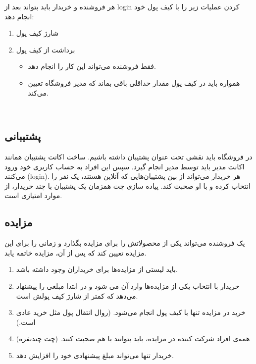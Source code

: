 \documentclass[]{article}
\begin{document}
هر فروشنده و خریدار باید بتواند بعد از login کردن عملیات زیر را با کیف پول خود انجام دهد:

\begin{enumerate}


\item
شارژ کیف پول

\item
برداشت از کیف پول

\begin{itemize}[label=$\blacksquare$]
\item
فقط فروشنده می‌تواند این کار را انجام دهد.

\item
همواره باید در کیف پول مقدار حداقلی باقی بماند که مدیر فروشگاه تعیین می‌کند.

\end{itemize}

\end{enumerate}



 \Large \textbf{\\
}
\subsection*{{\titr پشتیبانی}}

در فروشگاه باید نقشی تحت عنوان پشتیبان داشته باشیم. ساخت اکانت پشتیبان همانند اکانت \textcolor{CustomColor}{مدیر} باید توسط مدیر انجام گیرد. سپس این افراد به حساب کاربری خود ورود می‌کنند (‌login).  هر خریدار می‌تواند از بین پشتیبان‌هایی که آنلاین هستند، یک نفر را انتخاب کرده و با او صحبت کند. پیاده سازی چت همزمان یک پشتیبان با چند خریدار، از موارد امتیازی است.

\subsection*{{\titr مزایده}}

یک فروشنده می‌تواند یکی از محصولاتش را برای مزایده بگذارد و زمانی را برای این مزایده تعیین کند که پس از آن، مزایده خاتمه یابد. 

\begin{enumerate}

\item
باید لیستی از مزایده‌ها برای خریداران وجود داشته باشد.

\item
خریدار با انتخاب یکی از مزایده‌ها وارد آن می شود و در ابتدا مبلغی را پیشنهاد می‌دهد که کمتر از شارژ کیف پولش است.

\item
خرید در مزایده تنها با کیف پول انجام می‌شود. (روال انتقال پول مثل خرید عادی است.)

\item
همه‌ی افراد شرکت کننده در مزایده، باید بتوانند با هم صحبت کنند. (چت چندنفره)

\item
خریدار تنها می‌تواند مبلغ پیشنهادی خود را افزایش دهد.


\end{enumerate}
\end{document}
